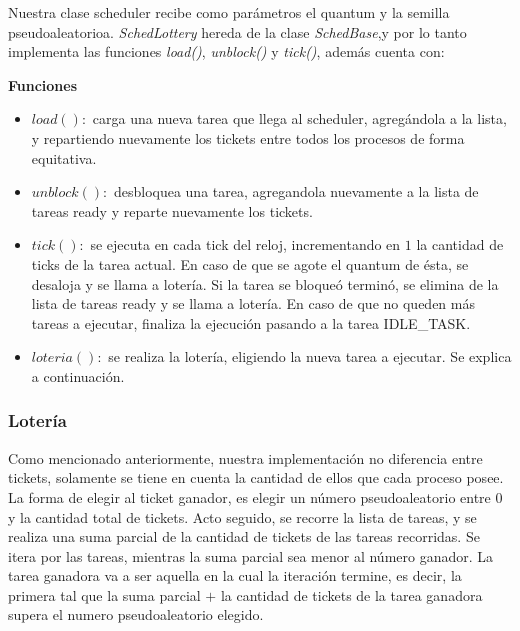 \vspace{2mm}

Nuestra clase scheduler recibe como par\'ametros el quantum y la semilla pseudoaleatorioa. \textit{SchedLottery} hereda de la clase \textit{SchedBase},y por lo tanto implementa las funciones \textit{load()}, \textit{unblock()} y \textit{tick()}, adem\'as cuenta con:

\vspace{2mm}

\textbf{Funciones}

\begin{itemize}

\item $load():$ carga una nueva tarea que llega al scheduler, agreg\'andola a la lista, y repartiendo nuevamente los tickets entre todos los procesos de forma equitativa.

\item $unblock(): $ desbloquea una tarea, agregandola nuevamente a la lista de tareas ready y reparte nuevamente los tickets.

\item $tick(): $ se ejecuta en cada tick del reloj, incrementando en $1$ la cantidad de ticks de la tarea actual. En caso de que se agote el quantum de \'esta, se desaloja y se llama a loter\'ia. Si la tarea se bloque\'o termin\'o, se elimina de la lista de tareas ready y se llama a loter\'ia. En caso de que no queden m\'as tareas a ejecutar, finaliza la ejecuci\'on pasando a la tarea IDLE\_TASK.
\item $loteria(): $ se realiza la loter\'ia, eligiendo la nueva tarea a ejecutar. Se explica a continuaci\'on.

\end{itemize}

\subsubsection{Loter\'ia}

Como mencionado anteriormente, nuestra implementaci\'on no diferencia entre tickets, solamente se tiene en cuenta la cantidad de ellos que cada proceso posee. La forma de elegir al ticket ganador, es elegir un n\'umero pseudoaleatorio entre 0 y la cantidad total de tickets. Acto seguido, se recorre la lista de tareas, y se realiza una suma parcial de la cantidad de tickets de las tareas recorridas. Se itera por las tareas, mientras la suma parcial sea menor al n\'umero ganador. La tarea ganadora va a ser aquella en la cual la iteraci\'on termine, es decir, la primera tal que la suma parcial $+$ la cantidad de tickets de la tarea ganadora supera el numero pseudoaleatorio elegido.

